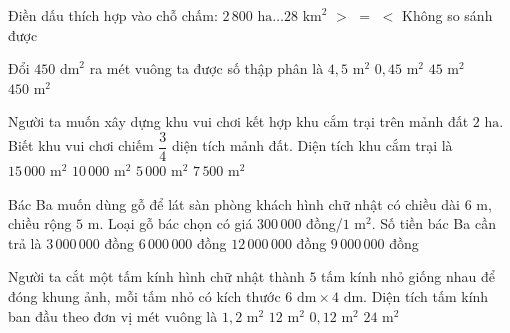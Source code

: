 \begin{ex} %
Điền dấu thích hợp vào chỗ chấm: $2\,800\text{ ha} \dots 28\text{ km}^2$
\choice
{$>$}
{\True $=$}
{$<$}
{Không so sánh được}
\end{ex}

\begin{ex} %
Đổi $450\text{ dm}^2$ ra mét vuông ta được số thập phân là
\choice
{\True $4{,}5\text{ m}^2$}
{$0{,}45\text{ m}^2$}
{$45\text{ m}^2$}
{$450\text{ m}^2$}
\end{ex}

\begin{ex} %
Người ta muốn xây dựng khu vui chơi kết hợp khu cắm trại trên mảnh đất $2\text{ ha}$. Biết khu vui chơi chiếm $\dfrac{3}{4}$ diện tích mảnh đất. Diện tích khu cắm trại là
\choice
{$15\,000\text{ m}^2$}
{$10\,000\text{ m}^2$}
{\True $5\,000\text{ m}^2$}
{$7\,500\text{ m}^2$}
\end{ex}

\begin{ex} %
Bác Ba muốn dùng gỗ để lát sàn phòng khách hình chữ nhật có chiều dài $6\text{ m}$, chiều rộng $5\text{ m}$. Loại gỗ bác chọn có giá $300\,000$ đồng/$1\text{ m}^2$. Số tiền bác Ba cần trả là
\choice
{$3\,000\,000$ đồng}
{$6\,000\,000$ đồng}
{$12\,000\,000$ đồng}
{\True $9\,000\,000$ đồng}
\end{ex}

\begin{ex} %
Người ta cắt một tấm kính hình chữ nhật thành $5$ tấm kính nhỏ giống nhau để đóng khung ảnh, mỗi tấm nhỏ có kích thước $6\text{ dm} \times 4\text{ dm}$. Diện tích tấm kính ban đầu theo đơn vị mét vuông là
\choice
{\True $1{,}2\text{ m}^2$}
{$12\text{ m}^2$}
{$0{,}12\text{ m}^2$}
{$24\text{ m}^2$}
\end{ex}

